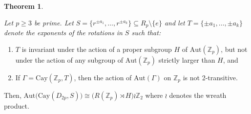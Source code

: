 \documentclass[12pt,reqno,a4paper]{amsart}
\theoremstyle{definition}
\newtheorem{thm}[defn]{Theorem}
\begin{document}
\begin{thm}\label{Theorem 3.6}
{\em
Let $p\ge 3$ be prime. Let
$S=\{r^{\pm a_1},\dots,r^{\pm a_k}\}\subseteq R_{p}\setminus\{e\}$
and let 
$T=\{\pm a_1,\dots,\pm a_k\}$
denote the exponents of the rotations in $S$ such that:
\begin{enumerate}
  \item 
  $T$ is invariant under the action of a proper subgroup $H$ of $\mathrm{Aut}(\mathbb{Z}_p)$, but not under the action of any subgroup of $\mathrm{Aut}(\mathbb {Z}_p)$ strictly larger than $H$, and
  \item If $\Gamma = \mathrm{Cay}(\mathbb{Z}_p,T)$, then the action of $\mathrm{Aut}(\Gamma)$ on $\mathbb{Z}_p$ is not 2-transitive. 
  
\end{enumerate}
Then,
$\mathrm{Aut}\bigl(\mathrm{Cay}(D_{2p},S)\bigr)\cong \bigl(R(\mathbb {Z}_p)\rtimes H\bigr)\wr \mathbb{Z}_2$
where $\wr$ denotes the wreath product.
}
\end{thm}
\end{document}
